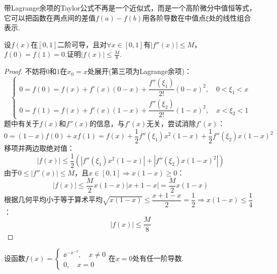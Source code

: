 带Lagrange余项的Taylor公式不再是一个近似式，而是一个高阶微分中值恒等式，它可以把函数在两点间的差值$f(a)-f(b)$用各阶导数在中值点$\xi$处的线性组合表示.

\begin{question}
    设$f(x)$在$[0,1]$二阶可导，且对$\forall x \in [0,1]$有$|f''(x)|\leqslant M$，$f(0)=f(1)=0$.证明$|f(x)|\leqslant\frac{M}{8}$.
\end{question}

\begin{proof}
    不妨将$0$和$1$在$x_0=x$处展开(第三项为Lagrange余项)：
    \[\begin{cases}
        0 = f(0) = f(x) + f'(x)(0-x) + \dfrac{f''(\xi_1)}{2!}(0-x)^2,\quad 0<\xi_1<x \\[1em]
        0 = f(1) = f(x) + f'(x)(1-x) + \dfrac{f''(\xi_2)}{2!}(1-x)^2,\quad x<\xi_2<1
    \end{cases}\]
    题中有关于$f(x)$和$f''(x)$的信息，与$f'(x)$无关，尝试消除$f'(x)$：
    \[0 = (1-x)f(0) + xf(1) = f(x) + \frac{1}{2}f''(\xi_1) x^2 (1-x) + \frac{1}{2}f''(\xi_2) x (1-x)^2\]
    移项并两边取绝对值：
    \[|f(x)| \leqslant \frac{1}{2}(|f''(\xi_1) x^2 (1-x)| + |f''(\xi_2) x (1-x)^2|)\]
    由于$0 \leqslant |f''(x)| \leqslant M$，且$x \in [0,1]\Rightarrow x(1-x)\geqslant 0$：
    \[|f(x)| \leqslant \frac{M}{2}x(1-x)|x+1-x| = \frac{M}{2}x(1-x)\]
    根据几何平均小于等于算术平均$\sqrt{x(1-x)}\leqslant\dfrac{x+1-x}{2}=\dfrac{1}{2}\Rightarrow x(1-x)\leqslant\dfrac{1}{4}$：
    \[|f(x)|\leqslant\frac{M}{8}\]
\end{proof}

\begin{question}
    设函数$f(x) = \begin{cases}
        \ee^{-x^{-2}},\quad x\neq 0\\
        0,\quad x=0
    \end{cases}$在$x=0$处有任一阶导数.
\end{question}

